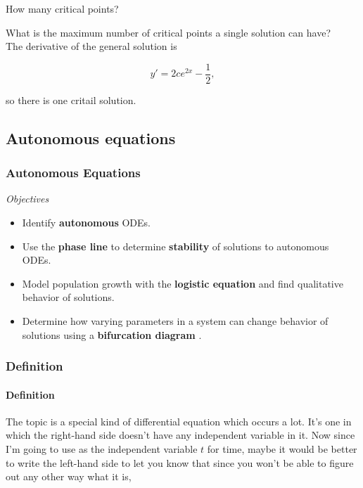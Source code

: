 \begin{problem}
  How many critical points? 
\end{problem}

What is the maximum number of critical points a single solution can have? \\

The derivative of the general solution is

\begin{equation*}
  y' = 2 c e^{2x} - \frac{1}{2},  
\end{equation*}

so there is one critail solution.

\clearpage

\subsection{Autonomous equations }

\subsubsection{Autonomous Equations}

\emph{Objectives}
\begin{itemize}
\item Identify  \textbf{\color{blue} autonomous} ODEs.
\item Use the \textbf{\color{blue}phase line} to determine \textbf{\color{blue}stability} of solutions to autonomous ODEs.
\item Model population growth with the \textbf{\color{blue}logistic equation}
  and find qualitative behavior of solutions.
\item Determine how varying parameters in a system can change behavior of solutions using a
  \textbf{\color{blue} bifurcation diagram }.
\end{itemize}

\clearpage

\subsubsection{Definition}

\paragraph{Definition}
The topic is a special kind of differential equation which occurs a lot.
It's one in which the right-hand side doesn't have
any independent variable in it.
Now since I'm going to use as the independent variable $t$
for time, maybe it would be better to write the left-hand
side to let you know that since you won't be able to figure out
any other way what it is,

